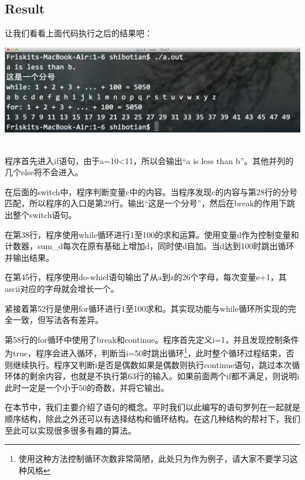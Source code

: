 \subsection{Result}
让我们看看上面代码执行之后的结果吧：
\\[\intextsep] 
  \begin{minipage}{\textwidth} 
    \centering 
    \includegraphics{codes/1-6/result.png}
    \label{fig:code-1-6-result} 
  \end{minipage}
\\[\intextsep]

程序首先进入if语句，由于a=10<11，所以会输出“a is less than b”。其他并列的几个else将不会进入。

在后面的switch中，程序判断变量c中的内容。当程序发现c的内容与第28行的分号匹配，所以程序的入口是第29行。输出“这是一个分号”，然后在break的作用下跳出整个switch语句。

在第38行，程序使用while循环进行1至100的求和运算。使用变量d作为控制变量和计数器，sum\_d每次在原有基础上增加d，同时使d自加。当d达到100时跳出循环并输出结果。

在第45行，程序使用do-whiel语句输出了从a到z的26个字母，每次变量e+1，其ascii对应的字母就会增长一个。

紧接着第52行是使用for循环进行1至100求和。其实现功能与while循环所实现的完全一致，但写法各有差异。

第58行的for循环中使用了break和continue。程序首先定义i=1，并且发现控制条件为true，程序会进入循环，判断当i=50时跳出循环\footnote{使用这种方法控制循环次数非常简陋，此处只为作为例子，请大家不要学习这种风格}，此时整个循环过程结束，否则继续执行。程序又判断i是否是偶数如果是偶数则执行continue语句，跳过本次循环体的剩余内容，也就是不执行第63行的输入。如果前面两个if都不满足，则说明i此时一定是一个小于50的奇数，并将它输出。

在本节中，我们主要介绍了语句的概念。平时我们以此编写的语句罗列在一起就是顺序结构，除此之外还可以有选择结构和循环结构。在这几种结构的帮衬下，我们至此可以实现很多很多有趣的算法。

